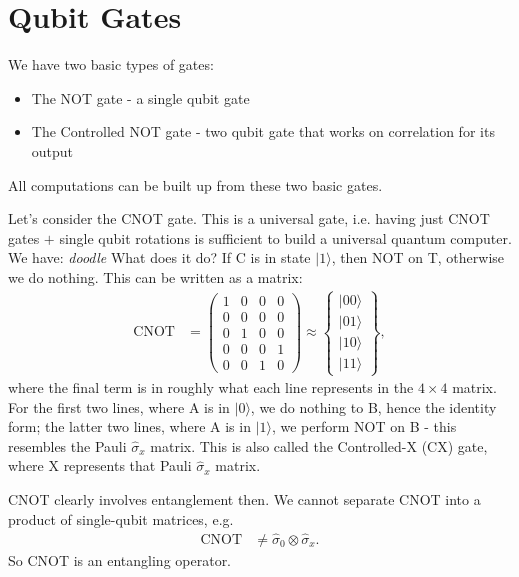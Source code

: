 \documentclass[lasers.tex]{subfiles}
\begin{document}
\section{Qubit Gates}
We have two basic types of gates:
\begin{itemize}
    \item The NOT gate - a single qubit gate
    \item The Controlled NOT gate - two qubit gate that works on correlation for its output
\end{itemize}
All computations can be built up from these two basic gates.

Let's consider the CNOT gate.
This is a universal gate, i.e. having just CNOT gates $+$ single qubit rotations is sufficient to build a universal quantum computer. 
We have:
\textit{doodle}
What does it do?
If C is in state $|1\rangle$, then NOT on T, otherwise we do nothing. 
This can be written as a matrix:
\begin{align}
    \text{CNOT} &= \begin{pmatrix} 1 & 0 & 0 & 0 \\ 0 & 0 & 0 & 0 \\ 0 & 1 & 0 & 0 \\ 0 & 0 & 0 & 1 \\ 0 & 0 & 1 & 0 \end{pmatrix} \approx \begin{Bmatrix} |00\rangle \\ |01\rangle \\ |10\rangle \\ |11\rangle\end{Bmatrix},
\end{align}
where the final term is in roughly what each line represents in the $4\times4$ matrix. 
For the first two lines, where A is in $|0\rangle$, we do nothing to B, hence the identity form; the latter two lines, where A is in $|1\rangle$, we perform NOT on B - this resembles the Pauli $\hat{\sigma}_x$ matrix. 
This is also called the Controlled-X (CX) gate, where X represents that Pauli $\hat{\sigma}_x$ matrix. 

CNOT clearly involves entanglement then. 
We cannot separate CNOT into a product of single-qubit matrices, e.g.
\begin{align}
    \text{CNOT} &\neq \hat{\sigma}_0\otimes\hat{\sigma}_x.
\end{align}
So CNOT is an entangling operator. 
\end{document}
